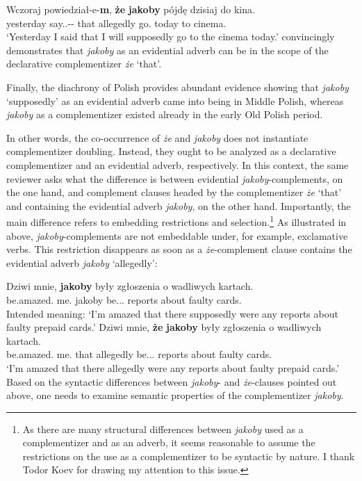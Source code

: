 \documentclass[output=paper
,modfonts
,nonflat]{langsci/langscibook}
\begin{document}
\ea  \label{plecak} \gll Wczoraj powiedział-e-\textbf{m}, \textbf{że} \textbf{jakoby} pójdę dzisiaj do kina.\\
  		yesterday say.{\lptcp}.{\sg}-{\masc}-{\firstperson}{\sg} that allegedly go.{\firstperson}{\sg} today to cinema.{\gen}\\
\glt	`Yesterday I said that  I will supposedly go to the cinema today.'
\z
{} convincingly demonstrates that \emph{jakoby} as an evidential adverb can be in the scope of the declarative complementizer \emph{że} `that'.

\noindent Finally, the diachrony of Polish provides abundant evidence showing that \emph{jakoby} `supposedly' as an evidential adverb came into being in Middle Polish, whereas \emph{jakoby} as a complementizer existed already in the early Old Polish period.

In other words, the co-occurrence of \emph{że} and \emph{jakoby} does not instantiate complementizer doubling. Instead, they ought to be analyzed as a declarative complementizer and an evidential adverb, respectively. In this context, the same reviewer asks what the difference is between evidential \emph{jakoby}-complements, on the one hand, and complement clauses headed by the complementizer \emph{że} `that' and containing the evidential adverb \emph{jakoby}, on the other hand. Importantly, the main difference refers to embedding restrictions and selection.\footnote{As there are many structural differences between \emph{jakoby} used as a complementizer and as an adverb, it seems reasonable to assume the restrictions on the use as a complementizer to be syntactic by nature. I thank Todor Koev for drawing my attention to this issue.
}
As illustrated in  above, \emph{jakoby}-complements are not embeddable under, for example, exclamative verbs. This restriction disappears as soon as a \emph{że}-complement clause contains the evidential adverb \emph{jakoby}  `allegedly':

\ea \ea \gll		*Dziwi mnie, \textbf{jakoby} były zgłoszenia o wadliwych kartach. \\
			be.amazed.{\thirdperson}{\sg} me.{\acc} jakoby be.{\lptcp}.{\nvir}.{\pl} reports about faulty cards.{\LOC} \\
	\glt		Intended meaning: `I'm amazed that there supposedly were any reports about faulty prepaid cards.'
	\ex \gll		Dziwi mnie, \textbf{że} \textbf{jakoby} były zgłoszenia o wadliwych kartach. \\
			be.amazed.{\thirdperson}{\sg} me.{\acc} that allegedly be.{\lptcp}.{\nvir}.{\pl} reports about faulty cards.{\LOC} \\
	\glt		`I'm amazed that there allegedly were any reports about faulty prepaid cards.'
\z\z
Based on the syntactic differences between \emph{jakoby}- and \emph{że}-clauses pointed out above, one needs to examine semantic properties of the complementizer \emph{jakoby}.
\end{document}
